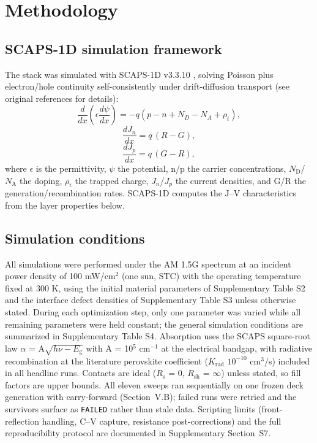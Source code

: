 \documentclass[aip,amsmath,amssymb,preprint]{revtex4-2}
\begin{document}
\section{Methodology}

\subsection{SCAPS-1D simulation framework}
The stack was simulated with SCAPS-1D v3.3.10 \cite{r19,r20}, solving Poisson plus electron/hole continuity self-consistently under drift-diffusion transport (see original references for details):
\begin{equation}\label{eq:poisson}
\frac{d}{dx}\left(\epsilon\frac{d\psi}{dx}\right) =
-q\left(p-n+N_{D}-N_{A}+\rho_{t}\right),
\end{equation}
\begin{equation}\label{eq:electron}
\frac{dJ_{n}}{dx} = q\,(R-G),
\end{equation}
\begin{equation}\label{eq:hole}
\frac{dJ_{p}}{dx} = q\,(G-R),
\end{equation}
where $\epsilon$ is the permittivity, $\psi$ the potential, n/p the carrier concentrations, $N_{\mathrm{D}}$/$N_{\mathrm{A}}$ the doping, $\rho_{\mathrm{t}}$ the trapped charge, $J_{n}$/$J_{p}$ the current densities, and G/R the generation/recombination rates. SCAPS-1D computes the J--V characteristics from the layer properties below.

\subsection{Simulation conditions}
All simulations were performed under the AM 1.5G spectrum at an incident power density of 100 mW/cm$^{2}$ (one sun, STC) with the operating temperature fixed at 300 K, using the initial material parameters of Supplementary Table S2 and the interface defect densities of Supplementary Table S3 unless otherwise stated. During each optimization step, only one parameter was varied while all remaining parameters were held constant; the general simulation conditions are summarized in Supplementary Table S4. Absorption uses the SCAPS square-root law $\alpha$ = A$\sqrt{h\nu-E_{\mathrm{g}}}$ with A = 10$^{5}$ cm$^{-1}$ at the electrical bandgap, with radiative recombination at the literature perovskite coefficient ($K_{\mathrm{rad}}$ $10^{-10}$ cm$^{3}$/s) included in all headline runs. Contacts are ideal ($R_{\mathrm{s}}$ = 0, $R_{\mathrm{sh}}$ = $\infty$) unless stated, so fill factors are upper bounds. All eleven sweeps ran sequentially on one frozen deck generation with carry-forward (Section~V.B); failed runs were retried and the survivors surface as \texttt{FAILED} rather than stale data. Scripting limits (front-reflection handling, C--V capture, resistance post-corrections) and the full reproducibility protocol are documented in Supplementary Section~S7.
\end{document}
